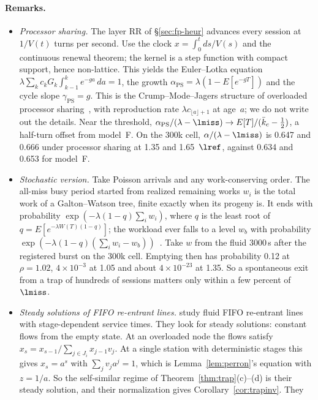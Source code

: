 \paragraph{Remarks.}
\begin{itemize}[leftmargin=*,nosep]
\item \emph{Processor sharing.} The layer RR of \S\ref{sec:fp-heur} advances every session at $1/V(t)$ turns per second. Use
the clock $x=\int_0^t ds/V(s)$ and the continuous renewal theorem; the kernel is a step function with compact support, hence
non-lattice. This yields the Euler--Lotka equation $\lambda\sum_kc_kG_k\int_{k-1}^ke^{-ga}\,da=1$, the growth
$\alpha_{\mathrm{PS}}=\lambda(1-E[e^{-gT}])$ and the cycle slope $\gamma_{\mathrm{PS}}=g$. This is the Crump--Mode--Jagers
structure of overloaded processor sharing~\citep{grishechkin1992processor,jeanmarie1994transient,puha2006overloaded}, with
reproduction rate $\lambda c_{\lfloor a\rfloor+1}$ at age~$a$; we do not write out the details. Near the threshold,
$\alpha_{\mathrm{PS}}/(\lambda-\lmiss)\to E[T]/(\bar k_c-\tfrac12)$, a half-turn offset from model~F. On the 300k cell,
$\alpha/(\lambda-\lmiss)$ is 0.647 and 0.666 under processor sharing at 1.35 and 1.65~$\lref$, against 0.634 and 0.653 for
model~F.
\item \emph{Stochastic version.} Take Poisson arrivals and any work-conserving order. The all-miss busy period started from
realized remaining works $w_i$ is the total work of a Galton--Watson tree, finite exactly when its progeny is. It ends with
probability $\exp(-\lambda(1-q)\sum_iw_i)$, where $q$ is the least root of $q=E[e^{-\lambda W(T)(1-q)}]$; the workload ever
falls to a level $w_b$ with probability $\exp(-\lambda(1-q)(\sum_iw_i-w_b))$~\citep{kendall1951some}. Take $w$ from the fluid
3000\,s after the registered burst on the 300k cell. Emptying then has probability 0.12 at $\rho=1.02$, $4\times10^{-3}$ at
1.05 and about $4\times10^{-23}$ at 1.35. So a spontaneous exit from a trap of hundreds of sessions matters only within a few percent
of $\lmiss$.
\item \emph{Steady solutions of FIFO re-entrant lines.} \citet{khanin2001steady} study fluid FIFO re-entrant lines with
stage-dependent service times. They look for steady solutions: constant flows from the empty state. At an overloaded node
the flows satisfy $x_s=x_{s-1}/\sum_{j\in J_i}x_{j-1}v_j$. At a single station with deterministic stages this gives
$x_s=a^s$ with $\sum_jv_ja^j=1$, which is Lemma~\ref{lem:perron}'s equation with $z=1/a$. So the self-similar regime of
Theorem~\ref{thm:trap}(c)--(d) is their steady solution, and their normalization gives Corollary~\ref{cor:trapinv}. They

\end{itemize}
